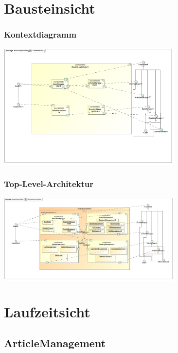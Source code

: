 \documentclass[a4paper]{article}
\begin{document}
\section{Bausteinsicht}

\subsubsection{Kontextdiagramm}

\includegraphics[width=350px]{kontextmodell.jpg}

\subsubsection{Top-Level-Architektur}

\includegraphics[width=350px]{top-level-architektur.jpg}

\section{Laufzeitsicht}

\subsection{ArticleManagement}
\end{document}
